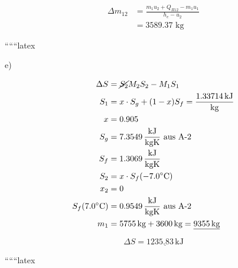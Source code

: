 \noindent
{}
\begin{align*}
    \Delta m_{12} &= \frac{m_1 u_2 + Q_{R12} - m_1 u_1}{h_e - u_2} \\
    &= 3589.37 \text{ kg}
\end{align*}

``````latex


e)

\begin{align*}
\Delta S &= \cancel{S_2} M_2 S_2 - M_1 S_1 \\
S_1 &= x \cdot S_g + (1-x) S_f = \frac{1.33714 \, \text{kJ}}{\text{kg}} \\
x &= 0.905 \\
S_g &= 7.3549 \, \frac{\text{kJ}}{\text{kgK}} \text{ aus A-2} \\
S_f &= 1.3069 \, \frac{\text{kJ}}{\text{kgK}} \\
S_2 &= x \cdot S_f (-7.0^\circ \text{C}) \\
x_2 &= 0 \\
S_f (7.0^\circ \text{C}) &= 0.9549 \, \frac{\text{kJ}}{\text{kgK}} \text{ aus A-2} \\
m_1 &= 5755 \, \text{kg} + 3600 \, \text{kg} = \underline{9355 \, \text{kg}}
\end{align*}

\[
\Delta S = \underline{1235.83 \, \text{kJ}}
\]

``````latex


